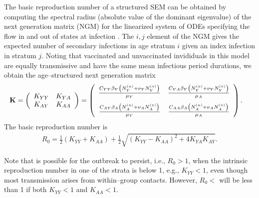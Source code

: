 The basic reproduction number of a structured SEM can be obtained by computing the spectral radius (absolute value of the dominant eigenvalue) of the next generation matrix (NGM) for the linearized system of ODEs specifying the flow in and out of states at infection \cite{heffernan2005perspectives,van2017reproduction,van2008further}. The $ i,j $ element of the NGM gives the expected number of secondary infections in age stratum $ i $ given an index infection in stratum $ j $. Noting that vaccinated and unvaccinated invididuals in this model are equally transmissive and have the same mean infectious period durations, we obtain the age--structured next generation matrix
\begin{align}
\label{eqn:sirs_ngm_full}
\mathbf{K} &= 
	\left (
	\begin{array}{cc}
	K_{YY} & K_{YA} \\
	K_{AY} & K_{AA}
	\end{array}
	\right ) =\left (
	\begin{array}{cc}
	\frac{C_{YY}\beta_Y\left (N_Y^{(u)} + \nu_YN_Y^{(v)}\right )}{\mu_Y} & \frac{C_{YA}\beta_Y\left (N_Y^{(u)} + \nu_YN_Y^{(v)}\right )}{\mu_A} \\[2ex]
	\frac{C_{AY}\beta_A\left (N_A^{(u)} + \nu_AN_A^{(v)}\right )}{\mu_Y} & \frac{C_{AA}\beta_A\left (N_A^{(u)} + \nu_AN_A^{(v)}\right )}{\mu_A}
	\end{array}
	\right ).
\end{align}
The basic reproduction number is 
\begin{align}
\label{eqn:sirs_R0}
R_0 = \frac{1}{2}\left (K_{YY} + K_{AA}\right ) + \frac{1}{2}\sqrt{(K_{YY} - K_{AA})^2 + 4K_{YA}K_{AY}}.
\end{align}

Note that is possible for the outbreak to persist, i.e., $ R_0 > 1 $,  when the intrinsic reproduction number in one of the strata is below 1, e.g., $ K_{YY} <1$, even though most transmission arises from within--group contacts. However, $ R_0 <$ will be less than 1 if both $ K_{YY} <1 $ and $ K_{AA} <1 $.

